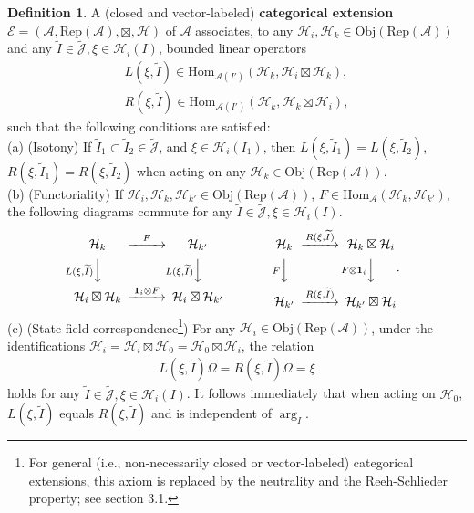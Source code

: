 \documentclass[12pt,a4paper]{article}
\theoremstyle{definition}
\newtheorem{df}{Definition}[section]
\theoremstyle{plain}
\newcommand{\fk}{\mathfrak}
\newcommand{\mc}{\mathcal}
\newcommand{\wtd}{\widetilde}
\newcommand{\id}{\mathbf{1}}
\newcommand{\Hom}{\mathrm{Hom}}
\newcommand{\scr}{\mathscr}
\newcommand{\Jtd}{\widetilde{\mathcal J}}
\newcommand{\RepA}{\mathrm{Rep}(\mc A)}
\newcommand{\Obj}{\mathrm{Obj}}
\numberwithin{equation}{section}
\begin{document}
\begin{df}\label{lb1}
A (closed and  vector-labeled) \textbf{categorical extension} $\scr E=(\mc A,\RepA,\boxtimes,\mc H)$ of $\mc A$ associates, to any  $\mc H_i,\mc H_k\in\Obj(\RepA)$ and any $\wtd I\in\Jtd,\fk \xi\in\mc H_i(I)$, bounded linear operators
	\begin{gather*}
	L(\xi,\wtd I)\in\Hom_{\mc A(I')}(\mc H_k,\mc H_i\boxtimes\mc H_k),\\
	R(\xi,\wtd I)\in\Hom_{\mc A(I')}(\mc H_k,\mc H_k\boxtimes\mc H_i),
	\end{gather*}
	such that the following conditions are satisfied:\\
	(a) (Isotony) If $\wtd I_1\subset\wtd I_2\in\Jtd$, and $\xi\in\mc H_i(I_1)$, then $L(\xi,\wtd I_1)=L(\xi,\wtd I_2)$, $R(\xi,\wtd I_1)=R(\xi,\wtd I_2)$ when acting on any  $\mc H_k\in\Obj(\RepA)$.\\
	(b) (Functoriality) If $\mc H_{i},\mc H_k,\mc H_{k'}\in\Obj(\RepA)$, $F\in\Hom_{\mc A}(\mc H_k,\mc H_{k'})$,  the following diagrams commute for any $\wtd I\in\Jtd,\xi\in\mc H_i(I)$.
	\begin{gather}
	\begin{CD}
	\mc H_k @>F>> \mc H_{k'}\\
	@V L(\xi,\wtd I)  VV @V L(\xi,\wtd I)  VV\\
	\mc H_i\boxtimes\mc H_k @> \id_i\otimes F>> \mc H_i\boxtimes\mc H_{k'}
	\end{CD}\qquad\qquad
	\begin{CD}
	\mc H_k @> R(\xi,\wtd I)  >> \mc H_k\boxtimes\mc H_i\\
	@V F VV @V F\otimes\id_i  VV\\
	\mc H_{k'} @>R(\xi,\wtd I) >> \mc H_{k'}\boxtimes\mc H_i
	\end{CD}.
	\end{gather}
	(c) (State-field correspondence\footnote{For general (i.e., non-necessarily closed or vector-labeled) categorical extensions, this axiom is replaced by the neutrality and the Reeh-Schlieder property; see \cite{Gui21a} section 3.1.}) For any $\mc H_i\in\Obj(\RepA)$, under the identifications $\mc H_i=\mc H_i\boxtimes\mc H_0=\mc H_0\boxtimes\mc H_i$, the relation
	\begin{align}
	L(\xi,\wtd I)\Omega=R(\xi,\wtd I)\Omega=\xi
	\end{align}
	holds for any $\wtd I\in\Jtd,\xi\in\mc H_i(I)$. It follows immediately that when acting on $\mc H_0$, $L(\xi,\wtd I)$ equals $R(\xi,\wtd I)$ and is independent of $\arg_I$.\\

\end{df}
\end{document}

